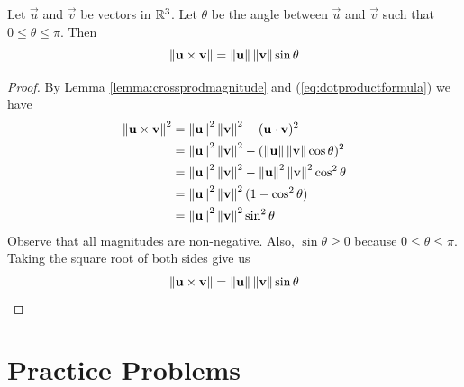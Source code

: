 \documentclass{ximera}
\begin{document}
\begin{theorem}\label{th:crossproductsin}
Let $\vec{u}$ and $\vec{v}$ be vectors in $\mathbb{R}^3$. Let $\theta$ be the angle between $\vec{u}$ and $\vec{v}$ such that $0\leq\theta\leq \pi$. Then
$$\left\lVert\mathbf{u}\times\mathbf{v}\right\rVert=\left\lVert\mathbf{u}\right\rVert\left\lVert\mathbf{v}\right\rVert\sin\theta$$
\end{theorem}
\begin{proof}
By Lemma \ref{lemma:crossprodmagnitude} and (\ref{eq:dotproductformula}) we have
\begin{align*}
\left\lVert\mathbf{u}\times\mathbf{v}\right\rVert^2&=\left\lVert\mathbf{u}\right\rVert^2\left\lVert\mathbf{v}\right\rVert^2-(\mathbf{u}\cdot\mathbf{v})^2\\
&=\left\lVert\mathbf{u}\right\rVert^2\left\lVert\mathbf{v}\right\rVert^2-(\left\lVert\mathbf{u}\right\rVert\left\lVert\mathbf{v}\right\rVert\cos \theta)^2\\
&=\left\lVert\mathbf{u}\right\rVert^2\left\lVert\mathbf{v}\right\rVert^2-\left\lVert\mathbf{u}\right\rVert^2\left\lVert\mathbf{v}\right\rVert^2\cos^2\theta\\
&=\left\lVert\mathbf{u}\right\rVert^2\left\lVert\mathbf{v}\right\rVert^2(1-\cos^2\theta)\\
&=\left\lVert\mathbf{u}\right\rVert^2\left\lVert\mathbf{v}\right\rVert^2\sin^2\theta
\end{align*}
Observe that all magnitudes are non-negative.  Also, $\sin\theta\geq 0$ because $0\leq\theta\leq \pi$.  Taking the square root of both sides give us
$$\left\lVert\mathbf{u}\times\mathbf{v}\right\rVert=\left\lVert\mathbf{u}\right\rVert\left\lVert\mathbf{v}\right\rVert\sin\theta$$
\end{proof}


\section*{Practice Problems}

\end{document}
